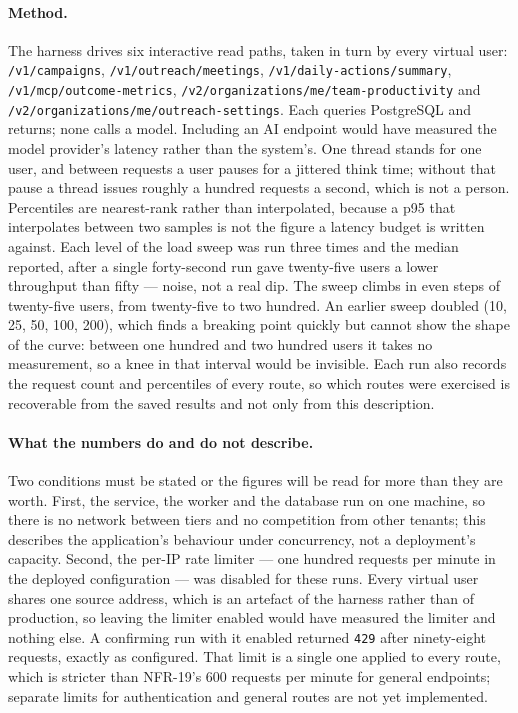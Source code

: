 \documentclass[a4paper]{article}
\begin{document}
\paragraph{Method.} The harness drives six interactive read paths, taken in turn
by every virtual user: \texttt{/v1/campaigns}, \texttt{/v1/outreach/meetings},
\texttt{/v1/daily-actions/summary}, \texttt{/v1/mcp/outcome-metrics},
\texttt{/v2/organizations/me/team-productivity} and
\texttt{/v2/organizations/me/outreach-settings}. Each queries PostgreSQL and
returns; none calls a model.
Including an AI endpoint would have measured the model provider's latency
rather than the system's. One thread stands for one user, and between requests
a user pauses for a jittered think time; without that pause a thread issues
roughly a hundred requests a second, which is not a person. Percentiles are
nearest-rank rather than interpolated, because a p95 that interpolates between
two samples is not the figure a latency budget is written against. Each level
of the load sweep was run three times and the median reported, after a single
forty-second run gave twenty-five users a lower throughput than fifty --- noise,
not a real dip. The sweep climbs in even steps of twenty-five users, from
twenty-five to two hundred. An earlier sweep doubled (10, 25, 50, 100, 200),
which finds a breaking point quickly but cannot show the shape of the curve:
between one hundred and two hundred users it takes no measurement, so a knee in
that interval would be invisible. Each run also records the request count and
percentiles of every route, so which routes were exercised is recoverable from
the saved results and not only from this description.

\paragraph{What the numbers do and do not describe.} Two conditions must be
stated or the figures will be read for more than they are worth. First, the
service, the worker and the database run on one machine, so there is no network
between tiers and no competition from other tenants; this describes the
application's behaviour under concurrency, not a deployment's capacity. Second,
the per-IP rate limiter --- one hundred requests per minute in the deployed
configuration --- was disabled for these runs. Every virtual user shares one
source address, which is an artefact of the harness rather than of production,
so leaving the limiter enabled would have measured the limiter and nothing
else. A confirming run with it enabled returned \texttt{429} after ninety-eight
requests, exactly as configured. That limit is a single one applied to every
route, which is stricter than NFR-19's 600 requests per minute for general
endpoints; separate limits for authentication and general routes are not yet
implemented.
\end{document}
